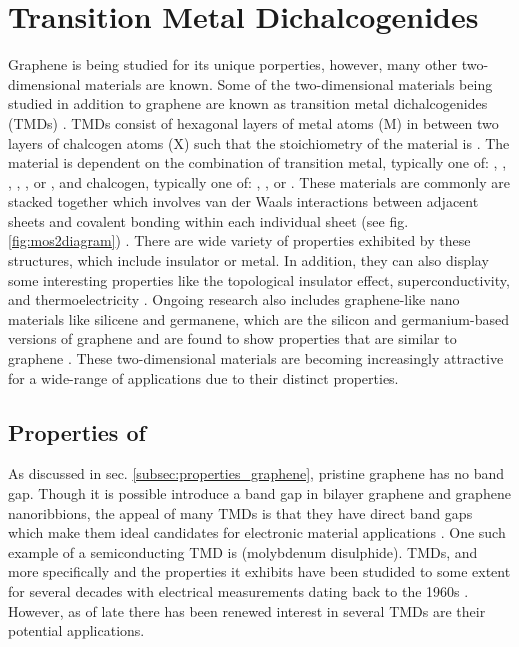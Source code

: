 \documentclass[%
 reprint,
 amsmath,amssymb,
 aps,
pra,
]{revtex4-1}
\begin{document}
\section{\label{sec:TMDs} Transition Metal Dichalcogenides}
Graphene is being studied for its unique porperties, however, many other two-dimensional materials are known. Some of the two-dimensional materials being studied in addition to graphene are known as transition metal dichalcogenides (TMDs) \cite{Mattheiss1973, Wilson1969}. TMDs consist of hexagonal layers of metal atoms (M) in between two layers of chalcogen atoms (X) such that the stoichiometry of the material is  \cite{grapheneLike2Dreview2013}. The material is dependent on the combination of transition metal, typically one of: , , , , , or , and chalcogen, typically one of: , , or  \cite{Wilson1969}. These materials are commonly are stacked together which involves van der Waals interactions between adjacent sheets and covalent bonding within each individual sheet (see fig. \ref{fig:mos2diagram}) \cite{grapheneLike2Dreview2013}. There are wide variety of properties exhibited by these structures, which include insulator or metal. In addition, they can also display some interesting properties like the topological insulator effect, superconductivity, and thermoelectricity \cite{Lang2012, Zhang2012, Gamble1975, Xie2009}. Ongoing research also includes graphene-like nano materials like silicene and germanene, which are the silicon and germanium-based versions of graphene and are found to show properties that are similar to graphene \cite{Takeda1994, Cahangirov2009}. These two-dimensional materials are becoming increasingly attractive for a wide-range of applications due to their distinct properties. 

\subsection{\label{subsec:mos2_properties} Properties of }
As discussed in sec. \ref{subsec:properties_graphene}, pristine graphene has no band gap. Though it is possible introduce a band gap in bilayer graphene and graphene nanoribbions, the appeal of many TMDs is that they have direct band gaps which make them ideal candidates for electronic material applications \cite{grapheneLike2Dreview2013}. One such example of a semiconducting TMD is  (molybdenum disulphide). TMDs, and more specifically  and the properties it exhibits have been studided to some extent for several decades with electrical measurements dating back to the 1960s \cite{Frindt1963, Fivaz1967}. However, as of late there has been renewed interest in several TMDs are their potential applications. 
\end{document}
